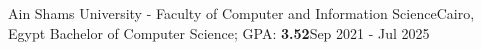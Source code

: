\resumeSubheading
{Ain Shams University - Faculty of Computer and Information Science}{Cairo, Egypt}
{Bachelor of Computer Science; GPA: \textbf{3.52}}{Sep 2021 - Jul 2025}
